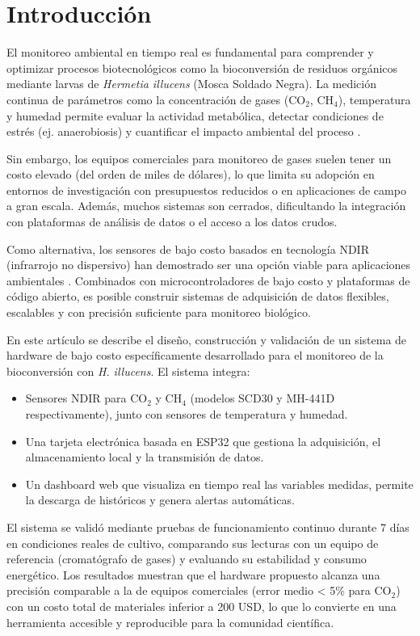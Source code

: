\section{Introducción}

El monitoreo ambiental en tiempo real es fundamental para comprender y optimizar procesos biotecnológicos como la bioconversión de residuos orgánicos mediante larvas de \textit{Hermetia illucens} (Mosca Soldado Negra). La medición continua de parámetros como la concentración de gases (CO$_2$, CH$_4$), temperatura y humedad permite evaluar la actividad metabólica, detectar condiciones de estrés (ej. anaerobiosis) y cuantificar el impacto ambiental del proceso \cite{eriksenDynamicModellingFeed2022}.

Sin embargo, los equipos comerciales para monitoreo de gases suelen tener un costo elevado (del orden de miles de dólares), lo que limita su adopción en entornos de investigación con presupuestos reducidos o en aplicaciones de campo a gran escala. Además, muchos sistemas son cerrados, dificultando la integración con plataformas de análisis de datos o el acceso a los datos crudos.

Como alternativa, los sensores de bajo costo basados en tecnología NDIR (infrarrojo no dispersivo) han demostrado ser una opción viable para aplicaciones ambientales \cite{biagiDevelopmentMachineLearningbased2024}. Combinados con microcontroladores de bajo costo y plataformas de código abierto, es posible construir sistemas de adquisición de datos flexibles, escalables y con precisión suficiente para monitoreo biológico.

En este artículo se describe el diseño, construcción y validación de un sistema de hardware de bajo costo específicamente desarrollado para el monitoreo de la bioconversión con \textit{H. illucens}. El sistema integra:

\begin{itemize}
    \item Sensores NDIR para CO$_2$ y CH$_4$ (modelos SCD30 y MH-441D respectivamente), junto con sensores de temperatura y humedad.
    \item Una tarjeta electrónica basada en ESP32 que gestiona la adquisición, el almacenamiento local y la transmisión de datos.
    \item Un dashboard web que visualiza en tiempo real las variables medidas, permite la descarga de históricos y genera alertas automáticas.
\end{itemize}

El sistema se validó mediante pruebas de funcionamiento continuo durante 7 días en condiciones reales de cultivo, comparando sus lecturas con un equipo de referencia (cromatógrafo de gases) y evaluando su estabilidad y consumo energético. Los resultados muestran que el hardware propuesto alcanza una precisión comparable a la de equipos comerciales (error medio < 5\% para CO$_2$) con un costo total de materiales inferior a 200 USD, lo que lo convierte en una herramienta accesible y reproducible para la comunidad científica.
